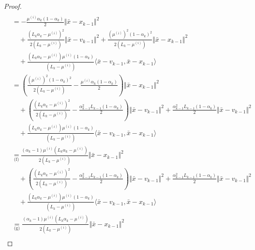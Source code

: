 \documentclass[12pt]{article}
\begin{document}
\begin{proof}
{\begin{align*}
            \\
            &= 
            - \frac{\mu^{(i)}\alpha_k(1 - \alpha_k)}{2}\Vert \bar x - x_{k - 1}\Vert^2 
                \\&\quad
                + \frac{(L_k\alpha_k - \mu^{(i)})^2}{2(L_k - \mu^{(i)})} \Vert \bar x - v_{k - 1}\Vert^2
                + \frac{(\mu^{(i)})^2(1 - \alpha_k)^2}{2(L_k - \mu^{(i)})}\Vert \bar x - x_{k - 1}\Vert^2 
                \\&\quad 
                + \frac{(L_k\alpha_k  - \mu^{(i)})\mu^{(i)}(1 - \alpha_k)}{(L_k - \mu^{(i)})}\langle \bar x - v_{k - 1}, \bar x - x_{k - 1}\rangle
            \\
            &= 
            \left(
                \frac{(\mu^{(i)})^2(1 - \alpha_k)^2}{2(L_k - \mu^{(i)})} - \frac{\mu^{(i)}\alpha_k(1 - \alpha_k)}{2}
            \right)\Vert \bar x - x_{k - 1}\Vert^2
                \\ &\quad 
                + \left(
                    \frac{(L_k\alpha_k - \mu^{(i)})^2}{2(L_k - \mu^{(i)})} - \frac{\alpha_{k - 1}^2L_{k - 1}(1 - \alpha_k)}{2}
                \right) \Vert \bar x - v_{k - 1}\Vert^2
                + \frac{\alpha_{k - 1}^2L_{k - 1}(1 - \alpha_k)}{2} \Vert \bar x - v_{k - 1}\Vert^2
                \\&\quad 
                + \frac{(L_k\alpha_k  - \mu^{(i)})\mu^{(i)}(1 - \alpha_k)}{(L_k - \mu^{(i)})}\langle \bar x - v_{k - 1}, \bar x - x_{k - 1}\rangle
            \\
            &\underset{\text{(f)}}{=}
            \frac{(\alpha_k - 1)\mu^{(i)}\left(L_k\alpha_k - \mu^{(i)}\right)}
            {2\left(L_k - \mu^{(i)}\right)} \Vert \bar x - x_{k - 1}\Vert^2
                \\ &\quad 
                + \left(
                    \frac{(L_k\alpha_k - \mu^{(i)})^2}{2(L_k - \mu^{(i)})} - \frac{\alpha_{k - 1}^2L_{k - 1}(1 - \alpha_k)}{2}
                \right) \Vert \bar x - v_{k - 1}\Vert^2
                + \frac{\alpha_{k - 1}^2L_{k - 1}(1 - \alpha_k)}{2} \Vert \bar x - v_{k - 1}\Vert^2
                \\&\quad 
                + \frac{(L_k\alpha_k  - \mu^{(i)})\mu^{(i)}(1 - \alpha_k)}{(L_k - \mu^{(i)})}\langle \bar x - v_{k - 1}, \bar x - x_{k - 1}\rangle
            \\
            & \underset{\text{(g)}}{=} 
            \frac{(\alpha_k - 1)\mu^{(i)}\left(L_k\alpha_k - \mu^{(i)}\right)}
            {2\left(L_k - \mu^{(i)}\right)}\Vert \bar x - x_{k - 1}\Vert^2
                \\ &\quad 

\end{align*}}
\end{proof}
\end{document}
